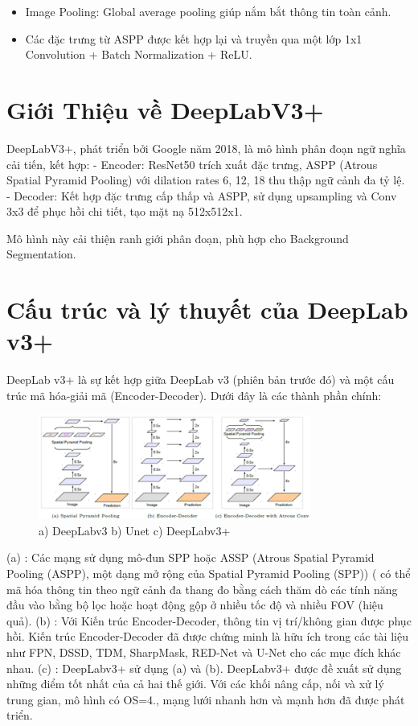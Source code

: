 \documentclass[12pt]{report}
\begin{document}
\begin{itemize}
    \item Image Pooling: Global average pooling giúp nắm bắt thông tin toàn cảnh.
    \item Các đặc trưng từ ASPP được kết hợp lại và truyền qua một lớp 1x1 Convolution + Batch Normalization + ReLU.
\end{itemize}


\section*{Giới Thiệu về DeepLabV3+}

DeepLabV3+, phát triển bởi Google năm 2018, là mô hình phân đoạn ngữ nghĩa cải tiến, kết hợp:
- Encoder: ResNet50 trích xuất đặc trưng, ASPP (Atrous Spatial Pyramid Pooling) với dilation rates 6, 12, 18 thu thập ngữ cảnh đa tỷ lệ.
- Decoder: Kết hợp đặc trưng cấp thấp và ASPP, sử dụng upsampling và Conv 3x3 để phục hồi chi tiết, tạo mặt nạ 512x512x1.

Mô hình này cải thiện ranh giới phân đoạn, phù hợp cho Background Segmentation.

\section*{Cấu trúc và lý thuyết của DeepLab v3+}

DeepLab v3+ là sự kết hợp giữa DeepLab v3 (phiên bản trước đó) và một cấu trúc mã hóa-giải mã (Encoder-Decoder). Dưới đây là các thành phần chính:

\begin{figure}[h]
    \centering
    \includegraphics[width=0.8\textwidth]{deeplab-compare.png}
    \caption{a) DeepLabv3 \quad b) Unet \quad c) DeepLabv3+}
\end{figure}

(a) : Các mạng sử dụng mô-đun SPP hoặc ASSP (Atrous Spatial Pyramid Pooling (ASPP), một dạng mở rộng của Spatial Pyramid Pooling (SPP)) ( có thể mã hóa thông tin theo ngữ cảnh đa thang đo bằng cách thăm dò các tính năng đầu vào bằng bộ lọc hoặc hoạt động gộp ở nhiều tốc độ và nhiều FOV (hiệu quả).  
(b) : Với Kiến trúc Encoder-Decoder, thông tin vị trí/không gian được phục hồi. Kiến trúc Encoder-Decoder đã được chứng minh là hữu ích trong các tài liệu như FPN, DSSD, TDM, SharpMask, RED-Net và U-Net cho các mục đích khác nhau.  
(c) : DeepLabv3+ sử dụng (a) và (b). DeepLabv3+ được đề xuất sử dụng những điểm tốt nhất của cả hai thế giới. Với các khối nâng cấp, nối và xử lý trung gian, mô hình có OS=4., mạng lưới nhanh hơn và mạnh hơn đã được phát triển.
\end{document}
